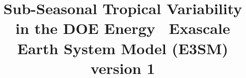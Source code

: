 \documentclass[draft,ms]{AGUTeX}
\begin{document}
%
%
%
%
%
%
%
%
%
%
%





%
%


\title{Sub-Seasonal Tropical Variability in the DOE Energy \ Exascale Earth System Model (E3SM) version 1}
%
%

%
%
\end{document}
